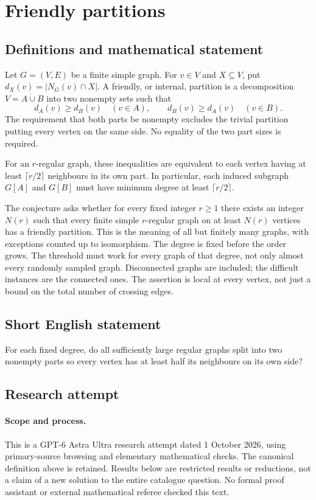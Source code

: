 \documentclass[11pt,a4paper]{article}
\begin{document}
\section*{Friendly partitions}\label{statement}

\subsection{Definitions and mathematical statement}
Let $G=(V,E)$ be a finite simple graph. For $v\in V$ and
$X\subseteq V$, put $d_X(v)=|N_G(v)\cap X|$. A friendly, or
internal, partition is a decomposition
$V=A\mathbin{\dot\cup}B$ into two nonempty sets such that
\[
 d_A(v)\geq d_B(v)\quad(v\in A),\qquad
 d_B(v)\geq d_A(v)\quad(v\in B).
\]
The requirement that both parts be nonempty excludes the trivial
partition putting every vertex on the same side. No equality of
the two part sizes is required.

For an $r$-regular graph, these inequalities are equivalent to
each vertex having at least $\lceil r/2\rceil$ neighbours in its
own part. In particular, each induced subgraph $G[A]$ and $G[B]$
must have minimum degree at least $\lceil r/2\rceil$.

The conjecture asks whether for every fixed integer $r\geq1$
there exists an integer $N(r)$ such that every finite simple
$r$-regular graph on at least $N(r)$ vertices has a friendly
partition. This is the meaning of all but finitely many graphs,
with exceptions counted up to isomorphism. The degree is fixed
before the order grows. The threshold must work for every graph
of that degree, not only almost every randomly sampled graph.
Disconnected graphs are included; the difficult instances are
the connected ones. The assertion is local at every vertex,
not just a bound on the total number of crossing edges.
\subsection{Short English statement}
For each fixed degree, do all sufficiently large regular graphs split into two nonempty parts so every vertex has at least half its neighbours on its own side?
\subsection{Research attempt}
\paragraph{Scope and process.}
This is a GPT-6 Astra Ultra research attempt dated 1 October 2026, using
primary-source browsing and elementary mathematical checks. The canonical
definition above is retained. Results below are restricted results or
reductions, not a claim of a new solution to the entire catalogue question.
No formal proof assistant or external mathematical referee checked this text.
\end{document}
